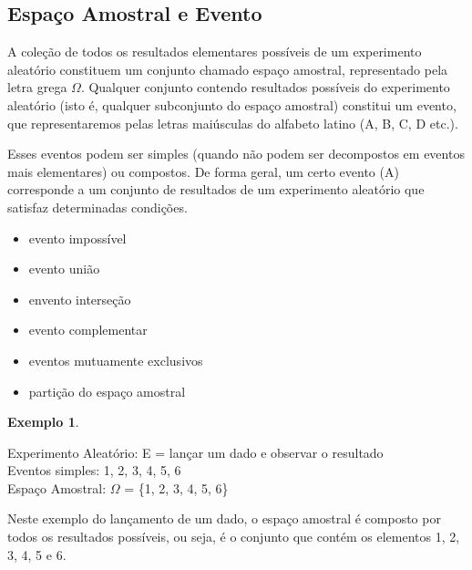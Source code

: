\documentclass[
]{book}
\providecommand{\tightlist}{%
  \setlength{\itemsep}{0pt}\setlength{\parskip}{0pt}}
\theoremstyle{definition}
\theoremstyle{definition}
\newtheorem{example}{Exemplo}[chapter]
\theoremstyle{definition}
\theoremstyle{remark}
\begin{document}
\hypertarget{espauxe7o-amostral-e-evento}{%
\subsection*{Espaço Amostral e Evento}\label{espauxe7o-amostral-e-evento}}

A coleção de todos os resultados elementares possíveis de um experimento aleatório constituem um conjunto chamado espaço amostral, representado pela letra grega \(\Omega\). Qualquer conjunto contendo resultados possíveis do experimento aleatório (isto é, qualquer subconjunto do espaço amostral) constitui um evento, que representaremos pelas letras maiúsculas do alfabeto latino (A, B, C, D etc.).

Esses eventos podem ser simples (quando não podem ser decompostos em eventos mais elementares) ou compostos. De forma geral, um certo evento (A) corresponde a um conjunto de resultados de um experimento aleatório que satisfaz determinadas condições.

\begin{itemize}
\tightlist
\item
  evento impossível\\
\item
  evento união\\
\item
  envento interseção\\
\item
  evento complementar\\
\item
  eventos mutuamente exclusivos\\
\item
  partição do espaço amostral
\end{itemize}

\begin{example}
\protect\hypertarget{exm:unnamed-chunk-1}{}{\label{exm:unnamed-chunk-1} }
\end{example}

Experimento Aleatório: E = lançar um dado e observar o resultado\\
Eventos simples: 1, 2, 3, 4, 5, 6\\
Espaço Amostral: \(\Omega\) = \{1, 2, 3, 4, 5, 6\}

Neste exemplo do lançamento de um dado, o espaço amostral é composto por todos os resultados possíveis, ou seja, é o conjunto que contém os elementos 1, 2, 3, 4, 5 e 6.
\end{document}
